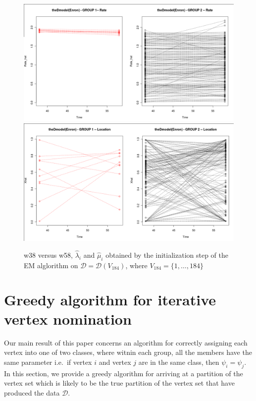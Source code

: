 \documentclass[12pt]{article}%
\begin{document}
\begin{figure}
\begin{center}
{\includegraphics[scale=0.20]{v184_w38vsw58_Rate.png}}
{\includegraphics[scale=0.20]{v184_w38vsw58_Location.png}}
\end{center}
\caption{w38 versus w58, $\hat{\lambda}_i$ and $\hat{\mu}_i$ obtained by the initialization step of the EM alglorithm on $\mathcal D = \mathcal D(V_{184})$, where $V_{184} = \{1,\ldots, 184\}$}
\label{cepplot}
\end{figure}

\section{Greedy algorithm for iterative vertex nomination}
Our main result of this paper concerns an algorithm 
for correctly assigning each vertex into one of two classes, where witnin each group, all the members  
have the same parameter i.e.\ if vertex $i$ and vertex $j$ are in the same
class, then $\psi_i = \psi_j$.  
In this section, we provide a greedy algorithm for arriving at a partition 
of the vertex set which is likely to be the true partition of 
the vertex set that  have produced the data $\mathcal D$.
\end{document}
